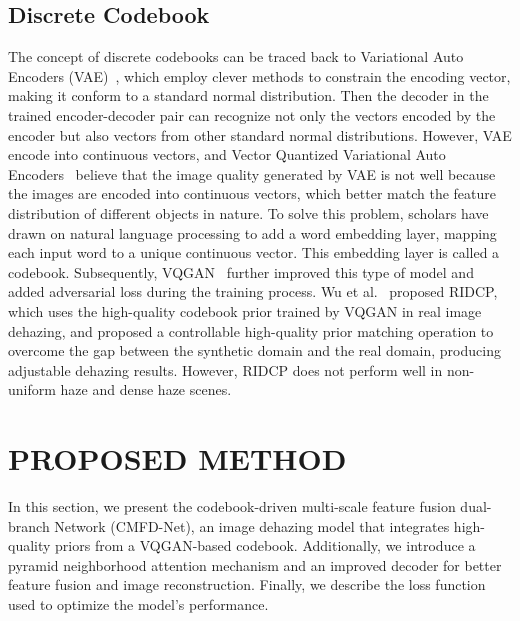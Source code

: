 \documentclass[journal]{IEEEtran}
\begin{document}
\subsection{Discrete Codebook}
The concept of discrete codebooks can be traced back to Variational Auto Encoders (VAE)~\cite{kingma2013auto}, which employ clever methods to constrain the encoding vector, making it conform to a standard normal distribution. Then the decoder in the trained encoder-decoder pair can recognize not only the vectors encoded by the encoder but also vectors from other standard normal distributions. However, VAE encode into continuous vectors, and Vector Quantized Variational Auto Encoders~\cite{van2017neural} believe that the image quality generated by VAE is not well because the images are encoded into continuous vectors, which better match the feature distribution of different objects in nature. To solve this problem, scholars have drawn on natural language processing to add a word embedding layer, mapping each input word to a unique continuous vector. This embedding layer is called a codebook. Subsequently, VQGAN~\cite{esser2021taming} further improved this type of model and added adversarial loss during the training process. Wu et al.~\cite{wu2023ridcp} proposed RIDCP, which uses the high-quality codebook prior trained by VQGAN in real image dehazing, and proposed a controllable high-quality prior matching operation to overcome the gap between the synthetic domain and the real domain, producing adjustable dehazing results. However, RIDCP does not perform well in non-uniform haze and dense haze scenes.



\section{PROPOSED METHOD}

In this section, we present the codebook-driven multi-scale feature fusion dual-branch Network (CMFD-Net), an image dehazing model that integrates high-quality priors from a VQGAN-based codebook. Additionally, we introduce a pyramid neighborhood attention mechanism and an improved decoder for better feature fusion and image reconstruction. Finally, we describe the loss function used to optimize the model’s performance.
\end{document}
